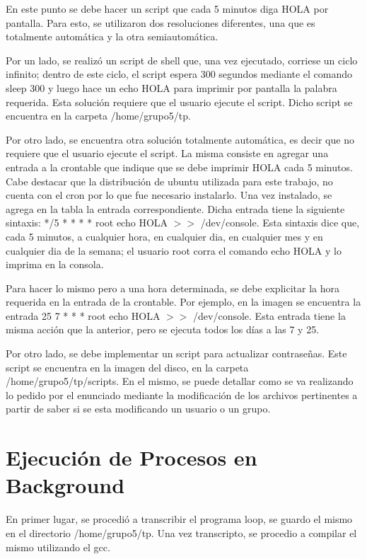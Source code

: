 \documentclass[a4paper, 12pt]{article}
\begin{document}
En este punto se debe hacer un script que cada 5 minutos diga HOLA por pantalla. Para esto, se utilizaron dos resoluciones diferentes, una que es totalmente autom\'atica y la otra semiautom\'atica. 

Por un lado, se realiz\'o un script de shell que, una vez ejecutado, corriese un ciclo infinito; dentro de este ciclo, el script espera 300 segundos mediante el comando sleep 300 y luego hace un echo HOLA para imprimir por pantalla la palabra requerida. Esta soluci\'on requiere que el usuario ejecute el script. Dicho script se encuentra en la carpeta /home/grupo5/tp.

Por otro lado, se encuentra otra soluci\'on totalmente autom\'atica, es decir que no requiere que el usuario ejecute el script. La misma consiste en agregar una entrada a la crontable que indique que se debe imprimir HOLA cada 5 minutos. Cabe destacar que la distribuci\'on de ubuntu utilizada para este trabajo, no cuenta con el cron por lo que fue necesario instalarlo. Una vez instalado, se agrega en la tabla la entrada correspondiente. Dicha entrada tiene la siguiente sintaxis: */5  * * * * root echo HOLA $>>$ /dev/console. Esta sintaxis dice que, cada 5 minutos, a cualquier hora, en cualquier dia, en cualquier mes y en cualquier dia de la semana; el usuario root corra el comando echo HOLA y lo imprima en la consola.

Para hacer lo mismo pero a una hora determinada, se debe explicitar la hora requerida en la entrada de la crontable. Por ejemplo, en la imagen se encuentra la entrada 25 7 * * * root echo HOLA $>>$ /dev/console. Esta entrada tiene la misma acci\'on que la anterior, pero se ejecuta todos los d\'ias a las 7 y 25. 

\bigskip



Por otro lado, se debe implementar un script para actualizar contrase\~{n}as. Este script se encuentra en la imagen del disco, en la carpeta /home/grupo5/tp/scripts. En el mismo, se puede detallar como se va realizando lo pedido por el enunciado mediante la modificaci\'on de los archivos pertinentes a partir de saber si se esta modificando un usuario o un grupo.

\section*{Ejecuci\'on de Procesos en Background}

En primer lugar, se procedi\'o a transcribir el programa loop, se guardo el mismo en el directorio /home/grupo5/tp. Una vez transcripto, se procedio a compilar el mismo utilizando el gcc. 
\end{document}
